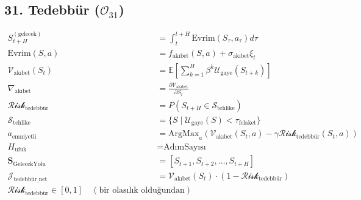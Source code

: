 \documentclass[11pt, a4paper]{article}
\begin{document}
\subsection{31. Tedebbür ($\mathcal{O}_{31}$)}
\begin{align}
S_{t+H}^{(\text{gelecek})} &= \int_t^{t+H} \text{Evrim}(S_\tau, a_\tau) d\tau \\
\text{Evrim}(S, a) &= f_{\text{akıbet}}(S, a) + \sigma_{\text{akıbet}} \xi_t \\
\mathcal{V}_{\text{akıbet}}(S_t) &= \mathbb{E}\left[ \sum_{k=1}^H \beta^k \mathcal{U}_{\text{gaye}}(S_{t+k}) \right] \\
\nabla_{\text{akıbet}} &= \frac{\partial \mathcal{V}_{\text{akıbet}}}{\partial S_t} \\
\mathcal{Risk}_{\text{tedebbür}} &= P(S_{t+H} \in \mathcal{S}_{\text{tehlike}}) \\
\mathcal{S}_{\text{tehlike}} &= \{ S \mid \mathcal{U}_{\text{gaye}}(S) < \tau_{\text{felaket}} \} \\
a_{\text{emniyetli}} &= \text{ArgMax}_a \left( \mathcal{V}_{\text{akıbet}}(S_t, a) - \gamma \mathcal{Risk}_{\text{tedebbür}}(S_t, a) \right) \\
H_{\text{ufuk}} &= \text{AdımSayısı} \\
\mathbf{S}_{\text{GelecekYolu}} &= [S_{t+1}, S_{t+2}, \dots, S_{t+H}] \\
\mathcal{J}_{\text{tedebbür\_net}} &= \mathcal{V}_{\text{akıbet}}(S_t) \cdot (1 - \mathcal{Risk}_{\text{tedebbür}}) \\
\mathcal{Risk}_{\text{tedebbür}} \in [0,1] \quad (\text{bir olasılık olduğundan})
\end{align}
\end{document}

